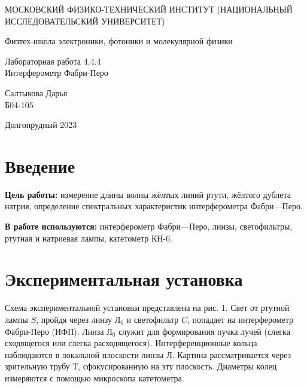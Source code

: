 \documentclass[a4paper,12pt]{article} %
\begin{document}
	
	\begin{titlepage}
	\begin{center}
		{\large МОСКОВСКИЙ ФИЗИКО-ТЕХНИЧЕСКИЙ ИНСТИТУТ (НАЦИОНАЛЬНЫЙ ИССЛЕДОВАТЕЛЬСКИЙ УНИВЕРСИТЕТ)}
	\end{center}
	\begin{center}
		{\large Физтех-школа электроники, фотоники и молекулярной физики}
	\end{center}
	
	
	\vspace{4.5cm}
	{\huge
		\begin{center}
			{Лабораторная работа 4.4.4}\\
			Интерферометр Фабри-Перо
		\end{center}
	}
	\vspace{2cm}
	\begin{flushright}
		{\LARGE Салтыкова Дарья \\
			\vspace{0.5cm}
			Б04-105}
	\end{flushright}
	\vspace{8cm}
	\begin{center}
		Долгопрудный 2023
	\end{center}
\end{titlepage}

\section{Введение}

\noindent \textbf{Цель работы:} измерение длины волны жёлтых линий ртути, жёлтого дублета натрия, определение спектральных характеристик интерферометра Фабри—Перо.

\medskip
	
\noindent \textbf{В работе используются:} интерферометр Фабри—Перо, линзы, светофильтры, ртутная и натриевая лампы, катетометр КН-6.
		

\section{Экспериментальная установка}

Схема экспериментальной установки представлена на рис. 1. Свет от ртутной лампы $ S $, пройдя через линзу $ Л_0 $ и светофильтр $ C $, попадает на интерферометр Фабри-Перо (ИФП). Линза $ Л_0 $ служит для
	формирования пучка лучей (слегка сходящегося или слегка расходящегося). Интерференционные кольца наблюдаются в локальной плоскости линзы $ Л $. Картина рассматривается через зрительную трубу $ Т $, сфокусированную на эту плоскость. Диаметры колец измеряются с помощью микроскопа катетометра.
	
\end{document}
